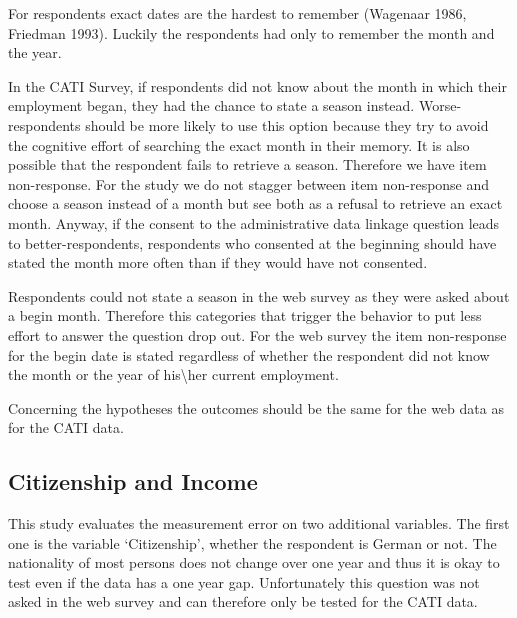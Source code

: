 For respondents exact dates are the hardest to remember (Wagenaar 1986, Friedman 1993). Luckily the respondents had only to remember the month and the year.

In the CATI Survey, if respondents did not know about the month in which their employment began, they had the chance to state a season instead. Worse-respondents should be more likely to use this option because they try to avoid the cognitive effort of searching the exact month in their memory. It is also possible that the respondent fails to retrieve a season. Therefore we have item non-response. For the study we do not stagger between item non-response and choose a season instead of a month but see both as a refusal to retrieve an exact month. Anyway, if the consent to the administrative data linkage question leads to better-respondents, respondents who consented at the beginning should have stated the month more often than if they would have not consented.

Respondents could not state a season in the web survey as they were asked about a begin month. Therefore this categories that trigger the behavior to put less effort to answer the question drop out. For the web survey the item non-response for the begin date is stated regardless of whether the respondent did not know the month or the year of his\textbackslash her current employment.

Concerning the hypotheses the outcomes should be the same for the web data as for the CATI data.


\subsection{Citizenship and Income}

This study evaluates the measurement error on two additional variables. The first one is the variable `Citizenship', whether the respondent is German or not. The nationality of most persons does not change over one year and thus it is okay to test even if the data has a one year gap. Unfortunately this question was not asked in the web survey and can therefore only be tested for the CATI data.

